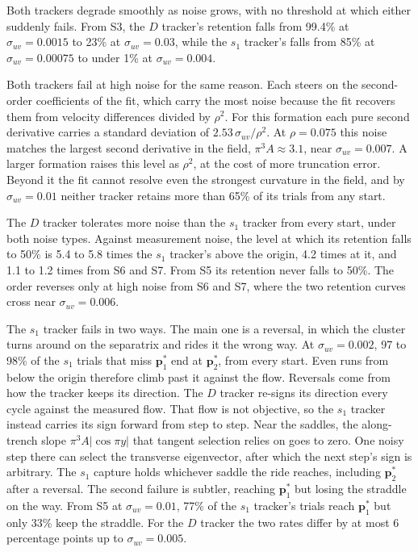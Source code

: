 \documentclass[lettersize,journal]{IEEEtran}
\begin{document}
Both trackers degrade smoothly as noise grows, with no threshold at which
either suddenly fails. From S3, the $D$ tracker's retention
falls from 99.4\% at $\sigma_{uv} = 0.0015$ to 23\% at $\sigma_{uv} = 0.03$,
while the $s_1$ tracker's falls from 85\% at $\sigma_{uv} = 0.00075$ to
under 1\% at $\sigma_{uv} = 0.004$.

Both trackers fail at high noise for the same reason. Each steers on the
second-order coefficients of the fit, which carry the most noise because
the fit recovers them from velocity differences divided by $\rho^2$. For
this formation each pure second derivative carries a standard deviation of
$2.53\,\sigma_{uv}/\rho^2$. At $\rho = 0.075$ this noise matches the
largest second derivative in the field, $\pi^3 A \approx 3.1$, near
$\sigma_{uv} = 0.007$. A larger formation raises this level as $\rho^2$,
at the cost of more truncation error. Beyond it the fit cannot resolve even
the strongest curvature in the field, and by $\sigma_{uv} = 0.01$ neither
tracker retains more than 65\% of its trials from any start.

The $D$ tracker tolerates more noise than the $s_1$ tracker from every
start, under both noise types. Against measurement noise, the level at
which its retention falls to 50\% is 5.4 to 5.8 times the $s_1$ tracker's
above the origin, 4.2 times at it, and 1.1 to 1.2 times from S6 and S7.
From S5 its retention never falls to 50\%. The
order reverses only at high noise from S6 and S7, where the two retention
curves cross near $\sigma_{uv} = 0.006$.

The $s_1$ tracker fails in two ways. The main one is a reversal, in which
the cluster turns around on the separatrix and rides it the wrong way. At
$\sigma_{uv} = 0.002$, 97 to 98\% of the $s_1$ trials that
miss $\mathbf{p}^*_1$ end at $\mathbf{p}^*_2$, from every start.
Even runs from below the origin therefore climb past it against the flow.
Reversals come from how the tracker keeps its direction. The $D$ tracker
re-signs its direction every cycle against the measured flow. That flow is
not objective, so the $s_1$ tracker instead carries its sign forward from
step to step. Near the saddles, the along-trench slope
$\pi^3 A|\cos\pi y|$ that tangent selection relies on goes to zero. One
noisy step there can select the transverse eigenvector, after which the
next step's sign is arbitrary. The $s_1$ capture holds whichever saddle
the ride reaches, including $\mathbf{p}^*_2$ after a reversal. The second
failure is subtler, reaching
$\mathbf{p}^*_1$ but losing the straddle on the way. From S5 at
$\sigma_{uv} = 0.01$, 77\% of the $s_1$ tracker's trials reach
$\mathbf{p}^*_1$ but only 33\% keep the straddle. For the $D$ tracker the
two rates differ by at most 6 percentage points up to
$\sigma_{uv} = 0.005$.
\end{document}
